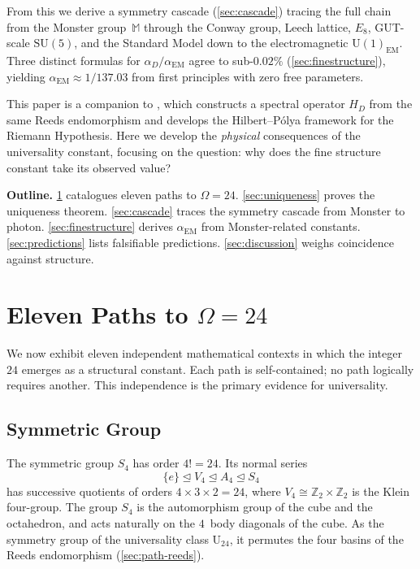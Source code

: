 \documentclass[11pt,a4paper]{article}
\theoremstyle{plain}
\theoremstyle{remark}
\renewcommand{\Omega}{\varOmega}
\newcommand{\Z}{\mathbb{Z}}
\newcommand{\SU}{\mathrm{SU}}
\newcommand{\aD}{\alpha_D}
\newcommand{\aEM}{\alpha_{\mathrm{EM}}}
\begin{document}
From this we derive a symmetry cascade (\cref{sec:cascade}) tracing
the full chain from the Monster group~$\mathbb{M}$ through the Conway
group, Leech lattice, $E_8$, GUT-scale $\SU(5)$, and the Standard Model
down to the electromagnetic $\mathrm{U}(1)_{\mathrm{EM}}$.
Three distinct formulas for $\aD/\aEM$ agree to sub-$0.02\%$
(\cref{sec:finestructure}), yielding $\aEM\approx 1/137.03$ from first
principles with zero free parameters.

This paper is a companion to \cite{DHR2026a}, which constructs a spectral
operator $H_D$ from the same Reeds endomorphism and develops the
Hilbert--P\'olya framework for the Riemann Hypothesis.  Here we develop
the \emph{physical} consequences of the universality constant, focusing
on the question: why does the fine structure constant take its observed
value?

\medskip
\noindent\textbf{Outline.}\enspace
\cref{sec:elevenpaths} catalogues eleven paths to $\Omega=24$.
\cref{sec:uniqueness} proves the uniqueness theorem.
\cref{sec:cascade} traces the symmetry cascade from Monster to photon.
\cref{sec:finestructure} derives $\aEM$ from Monster-related constants.
\cref{sec:predictions} lists falsifiable predictions.
\cref{sec:discussion} weighs coincidence against structure.


\section{Eleven Paths to $\Omega = 24$}
\label{sec:elevenpaths}

We now exhibit eleven independent mathematical contexts in which the
integer~$24$ emerges as a structural constant.  Each path is self-contained;
no path logically requires another.  This independence is the primary
evidence for universality.

\subsection{Symmetric Group}
\label{sec:path-S4}

The symmetric group $S_4$ has order $4!=24$.
Its normal series
\[
  \{e\}\trianglelefteq V_4 \trianglelefteq A_4 \trianglelefteq S_4
\]
has successive quotients of orders $4\times 3\times 2 = 24$, where $V_4
\cong\Z_2\times\Z_2$ is the Klein four-group.
The group $S_4$ is the automorphism group of the cube and the octahedron,
and acts naturally on the $4$~body diagonals of the cube.
As the symmetry group of the universality class $\mathrm{U}_{24}$, it
permutes the four basins of the Reeds endomorphism (\cref{sec:path-reeds}).
\end{document}
